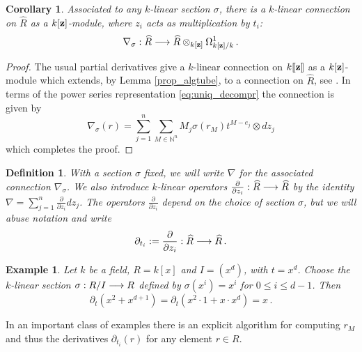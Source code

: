 \documentclass[english,letter paper,12pt,leqno]{article}
\newtheorem{corollary}[theorem]{Corollary}
\theoremstyle{example}
\newtheorem{definition}[theorem]{Definition}
\newtheorem{example}[theorem]{Example}
\numberwithin{equation}{section}
\def\be{\begin{equation}}
\def\ee{\end{equation}}
\begin{document}
\begin{corollary}\label{corollary:nabla_sigma} Associated to any $k$-linear section $\sigma$, there is a $k$-linear connection on $\widehat{R}$ as a $k[\bold{z}]$-module, where $z_i$ acts as multiplication by $t_i$:
\be
\nabla_\sigma: \widehat{R} \lto \widehat{R} \otimes_{k[\bold{z}]} \Omega^1_{k[\bold{z}]/k}\,.
\ee
\end{corollary}
\begin{proof}
The usual partial derivatives give a $k$-linear connection on $k\llbracket \bold{z} \rrbracket$ as a $k[\bold{z}]$-module which extends, by Lemma \ref{prop_algtube}, to a connection on $\widehat{R}$, see \cite[\S 8.1.3]{loday}. In terms of the power series representation \eqref{eq:uniq_decompr} the connection is given by
\be\label{eq:explicit_connection}
\nabla_\sigma(r) = \sum_{j=1}^n \sum_{M \in \mathbb{N}^n} M_j \sigma(r_M) t^{M - e_j} \otimes dz_j
\ee
which completes the proof.
\end{proof}

\begin{definition}
With a section $\sigma$ fixed, we will write $\nabla$ for the associated connection $\nabla_\sigma$. We also introduce $k$-linear operators $\frac{\partial}{\partial z_i}: \widehat{R} \longrightarrow \widehat{R}$ by the identity $\nabla = \sum_{j=1}^n \frac{\partial}{\partial z_i} dz_j$. The operators $\frac{\partial}{\partial z_i}$ depend on the choice of section $\sigma$, but we will abuse notation and write
\[
\partial_{t_i} := \frac{\partial}{\partial z_i}: \widehat{R} \longrightarrow \widehat{R}\,.
\]
\end{definition}

\begin{example}\label{example:dt_xd} Let $k$ be a field, $R = k[x]$ and $I = (x^d)$, with $t = x^d$. Choose the $k$-linear section $\sigma: R/I \longrightarrow R$ defined by $\sigma(x^i) = x^i$ for $0 \le i \le d - 1$. Then
\[
\partial_t( x^2 + x^{d+1} ) = \partial_t( x^2 \cdot 1 + x \cdot x^d ) = x\,.
\]
\end{example}

In an important class of examples there is an explicit algorithm for computing $r_M$ and thus the derivatives $\partial_{t_i}(r)$ for any element $r \in R$.
\end{document}
